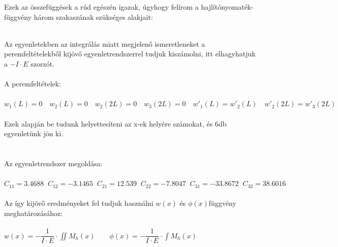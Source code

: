 \documentclass[10pt, a4paper]{article}
\begin{document}
	Ezek az összefüggések a rúd egészén igazak, úgyhogy felírom a hajlítónyomaték-függvény három szakaszának szükséges alakjait:
		\begin{table}[h]
		\renewcommand{\arraystretch}{1.8}
	\end{table}\\
	Az egyenletekben az integrálás miatt megjelenő ismeretleneket a peremfeltételekből kijövő egyenletrendszerrel tudjuk kiszámolni, itt elhagyhatjuk a $-I \cdot E$ szorzót.\\\\
	A peremfeltételek:\\\\
	$w_1(L) = 0 \quad w_2(L) = 0 \quad w_2(2L) = 0 \quad w_3(2L) = 0 \quad w'_1(L) = w'_2(L) \quad w'_2(2L) = w'_3(2L)$\\\\
	Ezek alapján be tudunk helyettesíteni az x-ek helyére számokat, és 6db egyenletünk jön ki.\\\\\\
	Az egyenletrendszer megoldása:\\\\
	$C_{11} = 3.4688 \;\; C_{12} = -3.1465 \;\; C_{21} = 12.539 \;\; C_{22} = -7.8047 \;\; C_{31} = -33.8672 \;\; C_{32} = 38.6016$\\\\
	Az így kijövő eredményeket fel tudjuk használni $w(x)$ és $\phi(x)$függvény meghatározásához:\\\\
	$w(x) = -\dfrac{1}{I \cdot E} \cdot \iint M_h(x) \quad\quad \phi(x) = -\dfrac{1}{I \cdot E} \cdot \int M_h(x)$
\end{document}
